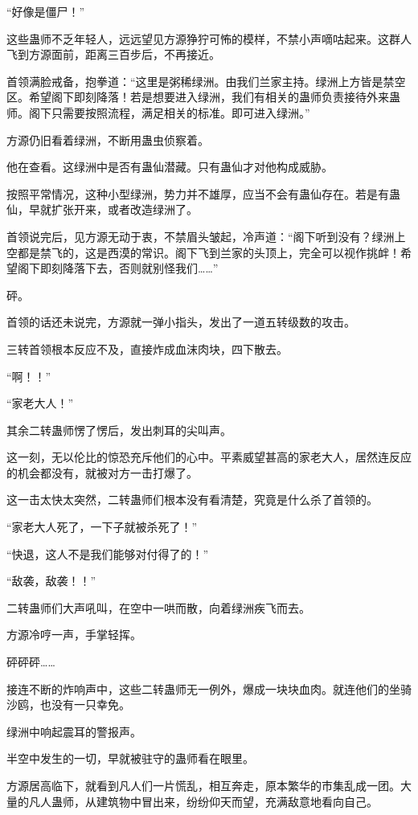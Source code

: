 \begin{this_body}
“好像是僵尸！”

这些蛊师不乏年轻人，远远望见方源狰狞可怖的模样，不禁小声嘀咕起来。这群人飞到方源面前，距离三百步后，不再接近。

首领满脸戒备，抱拳道：“这里是粥稀绿洲。由我们兰家主持。绿洲上方皆是禁空区。希望阁下即刻降落！若是想要进入绿洲，我们有相关的蛊师负责接待外来蛊师。阁下只需要按照流程，满足相关的标准。即可进入绿洲。”

方源仍旧看着绿洲，不断用蛊虫侦察着。

他在查看。这绿洲中是否有蛊仙潜藏。只有蛊仙才对他构成威胁。

按照平常情况，这种小型绿洲，势力并不雄厚，应当不会有蛊仙存在。若是有蛊仙，早就扩张开来，或者改造绿洲了。

首领说完后，见方源无动于衷，不禁眉头皱起，冷声道：“阁下听到没有？绿洲上空都是禁飞的，这是西漠的常识。阁下飞到兰家的头顶上，完全可以视作挑衅！希望阁下即刻降落下去，否则就别怪我们……”

砰。

首领的话还未说完，方源就一弹小指头，发出了一道五转级数的攻击。

三转首领根本反应不及，直接炸成血沫肉块，四下散去。

“啊！！”

“家老大人！”

其余二转蛊师愣了愣后，发出刺耳的尖叫声。

这一刻，无以伦比的惊恐充斥他们的心中。平素威望甚高的家老大人，居然连反应的机会都没有，就被对方一击打爆了。

这一击太快太突然，二转蛊师们根本没有看清楚，究竟是什么杀了首领的。

“家老大人死了，一下子就被杀死了！”

“快退，这人不是我们能够对付得了的！”

“敌袭，敌袭！！”

二转蛊师们大声吼叫，在空中一哄而散，向着绿洲疾飞而去。

方源冷哼一声，手掌轻挥。

砰砰砰……

接连不断的炸响声中，这些二转蛊师无一例外，爆成一块块血肉。就连他们的坐骑沙鸥，也没有一只幸免。

绿洲中响起震耳的警报声。

半空中发生的一切，早就被驻守的蛊师看在眼里。

方源居高临下，就看到凡人们一片慌乱，相互奔走，原本繁华的市集乱成一团。大量的凡人蛊师，从建筑物中冒出来，纷纷仰天而望，充满敌意地看向自己。


\end{this_body}
